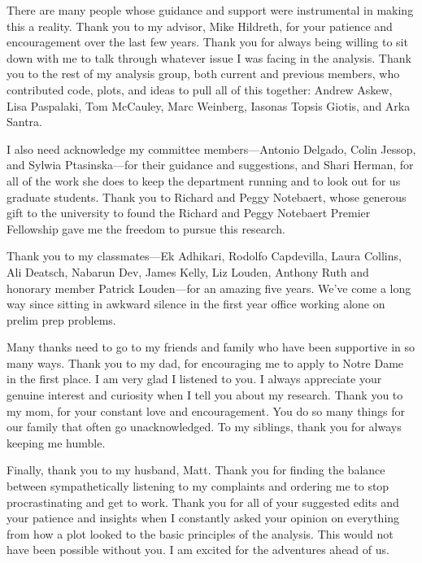 \documentclass[final,numrefs,compress]{nddiss2e}
\begin{document}
  \begin{acknowledge}

There are many people whose guidance and support were instrumental in making this a reality. Thank you to my advisor, Mike Hildreth, for your patience and encouragement over the last few years. Thank you for always being willing to sit down with me to talk through whatever issue I was facing in the analysis. Thank you to the rest of my analysis group, both current and previous members, who contributed code, plots, and ideas to pull all of this together: Andrew Askew, Lisa Paspalaki, Tom McCauley, Marc Weinberg, Iasonas Topsis Giotis, and Arka Santra. 

I also need acknowledge my committee members---Antonio Delgado, Colin Jessop, and Sylwia Ptasinska---for their guidance and suggestions, and Shari Herman, for all of the work she does to keep the department running and to look out for us graduate students. Thank you to Richard and Peggy Notebaert, whose generous gift to the university to found the Richard and Peggy Notebaert Premier Fellowship gave me the freedom to pursue this research. 

Thank you to my classmates---Ek Adhikari, Rodolfo Capdevilla, Laura Collins, Ali Deatsch, Nabarun Dev, James Kelly, Liz Louden, Anthony Ruth and honorary member Patrick Louden---for an amazing five years. We've come a long way since sitting in awkward silence in the first year office working alone on prelim prep problems. 

Many thanks need to go to my friends and family who have been supportive in so many ways. Thank you to my dad, for encouraging me to apply to Notre Dame in the first place. I am very glad I listened to you. I always appreciate your genuine interest and curiosity when I tell you about my research. Thank you to my mom, for your constant love and encouragement. You do so many things for our family that often go unacknowledged. To my siblings, thank you for always keeping me humble. 

Finally, thank you to my husband, Matt. Thank you for finding the balance between sympathetically listening to my complaints and ordering me to stop procrastinating and get to work. Thank you for all of your suggested edits and your patience and insights when I constantly asked your opinion on everything from how a plot looked to the basic principles of the analysis. This would not have been possible without you. I am excited for the adventures ahead of us.
  
  \end{acknowledge}
\end{document}
